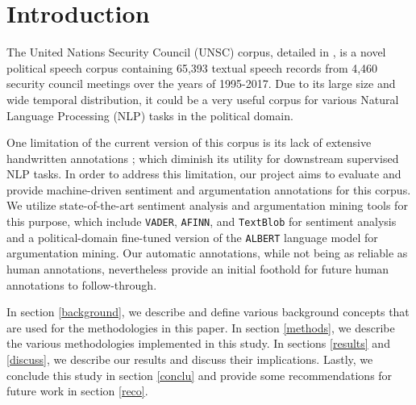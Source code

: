 \section{Introduction}

The United Nations Security Council (UNSC) corpus, detailed in \citet{schnfeld2019security}, is a novel political speech corpus containing 65,393 textual speech records from 4,460 security council meetings over the years of 1995-2017. Due to its large size and wide temporal distribution, it could be a very useful corpus for various Natural Language Processing (NLP) tasks in the political domain.

One limitation of the current version of this corpus is its lack of extensive handwritten annotations \citep{schnfeld2019security}; which diminish its utility for downstream supervised NLP tasks. In order to address this limitation, our project aims to evaluate and provide machine-driven sentiment and argumentation annotations for this corpus. We utilize state-of-the-art sentiment analysis and argumentation mining tools for this purpose, which include \texttt{VADER}, \texttt{AFINN}, and \texttt{TextBlob} for sentiment analysis and a political-domain fine-tuned version of the \texttt{ALBERT} language model for argumentation mining. Our automatic annotations, while not being as reliable as human annotations, nevertheless provide an initial foothold for future human annotations to follow-through.

In section \ref{background}, we describe and define various background concepts that are used for the methodologies in this paper. In section \ref{methods}, we describe the various methodologies implemented in this study. In sections \ref{results} and \ref{discuss}, we describe our results and discuss their implications. Lastly, we conclude this study in section \ref{conclu} and provide some recommendations for future work in section \ref{reco}.